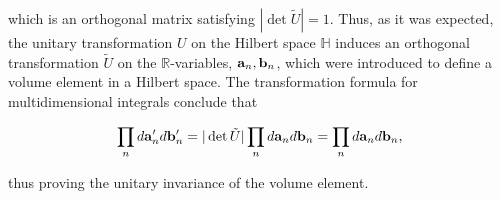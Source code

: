 \documentclass{homework}
\begin{document}
which is an orthogonal matrix satisfying $|\det \tilde U|= 1$. Thus, as it was expected, the unitary transformation $U$ on the Hilbert space $\mathds{H}$ induces an orthogonal transformation $\tilde{U}$ on the $\mathds{R}$-variables, ${\bf a}_n, {\bf b}_n$, which were introduced to define a volume element in a Hilbert space. The transformation formula for multidimensional integrals conclude that 

$$
\prod_{n} d{\bf a}'_n d{\bf b}'_n = |\det \tilde U| \prod_{n} d{\bf a}_n d{\bf b}_n = \prod_{n} d{\bf a}_n d{\bf b}_n,
$$

thus proving the unitary invariance of the volume element. 
\end{document}
